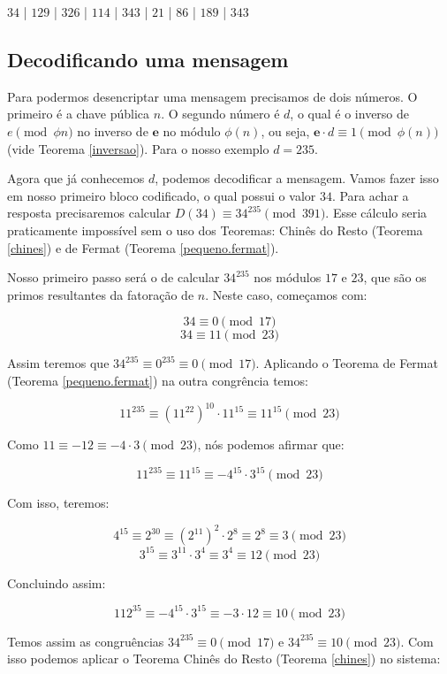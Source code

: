 \begin{center}
	 $34$ | $129$ | $326$ | $114$ | $343$ | $21$ | $86$ | $189$ | $343$
\end{center}

\subsection{Decodificando uma mensagem}

Para podermos desencriptar uma mensagem precisamos de dois n\'umeros. O primeiro \'e a chave p\'ublica $n$. O segundo n\'umero \'e $d$, o qual é o inverso de $e \pmod{\phi{n}}$ no inverso de $\textbf{e}$ no m\'odulo $\phi(n)$, ou seja, $\textbf{e} \cdot d \equiv 1 \pmod{\phi(n)}$ (vide Teorema \ref{inversao}). Para o nosso exemplo $d= 235$.

Agora que j\'a conhecemos $d$, podemos decodificar a mensagem. Vamos fazer isso em nosso primeiro bloco codificado, o qual possui o valor $34$. Para achar a resposta precisaremos calcular $D(34) \equiv 34^{235} \pmod{391}$. Esse c\'alculo seria praticamente imposs\'ivel sem o uso dos Teoremas: Chin\^es do Resto (Teorema \ref{chines}) e de Fermat (Teorema \ref{pequeno.fermat}).

Nosso primeiro passo ser\'a o de calcular $34^{235}$ nos m\'odulos $17$ e $23$, que s\~ao os primos resultantes da fatora\c{c}\~ao de $n$. Neste caso, come\c{c}amos com:

$$34 \equiv 0 \pmod{17}$$
$$34 \equiv 11 \pmod{23}$$

Assim teremos que $34^{235} \equiv 0^{235} \equiv 0 \pmod{17}$. Aplicando o Teorema de Fermat (Teorema \ref{pequeno.fermat}) na outra congr\^encia temos:

$$11^{235} \equiv (11^{22})^{10} \cdot 11^{15} \equiv 11^{15} \pmod{23}$$

Como $ 11 \equiv -12 \equiv -4 \cdot 3 \pmod{23}$, n\'os podemos afirmar que:

$$11^{235} \equiv 11^{15} \equiv -4^{15} \cdot 3^{15}\pmod{23}$$

Com isso, teremos:

$$4^{15} \equiv 2^{30} \equiv (2^{11})^2 \cdot 2^8 \equiv 2^8 \equiv 3 \pmod{23}$$
$$3^{15} \equiv 3^{11} \cdot 3^4 \equiv 3^4 \equiv 12 \pmod{23}$$

Concluindo assim:

$$112^{35} \equiv -4^{15} \cdot 3^{15} \equiv -3 \cdot 12 \equiv 10 \pmod{23}$$

Temos assim as congru\^encias $34^{235} \equiv 0 \pmod{17}$ e $34^{235} \equiv 10 \pmod{23}$. Com isso podemos aplicar o Teorema Chin\^es do Resto (Teorema \ref{chines}) no sistema:

